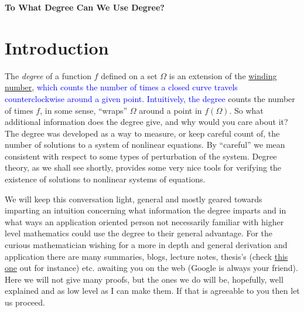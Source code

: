 \documentclass[11pt]{article}
\theoremstyle{plain}
\theoremstyle{definition}
\theoremstyle{remark}
\newcommand{\add}[1]{\textcolor{blue}{#1}}
\begin{document}
\begin{center}
\textbf{To What Degree Can We Use Degree?} %
\end{center}

\section{Introduction}
The \emph{degree} of a function $f$ defined on a set $\Omega$
is an extension of the \href{https://en.wikipedia.org/wiki/Winding_number}{winding number},
\add{which counts the number of times a closed curve travels counterclockwise around a given point.
Intuitively, the degree} counts the number of times $f$, in some sense, ``wraps'' $\Omega$ around a point in $f\left(\Omega\right)$.   
So what additional information does the degree give, and why would you care about it?
The degree was developed as a way to measure, or keep careful count of, the number of solutions to a system of nonlinear equations.
By ``careful'' we mean consistent with respect to some types of perturbation of the system.
Degree theory, as we shall see shortly, provides some very nice tools for verifying the existence of solutions to nonlinear systems of equations. 

\medskip
We will keep this conversation light, general and mostly geared towards imparting an intuition concerning what information the degree imparts and in what ways an application oriented person not necessarily familiar with higher level mathematics could use the degree to their general advantage. For the curious mathematician wishing for a more in depth and general derivation and application there are many summaries, blogs, lecture notes, thesis's (check \href{http://jultika.oulu.fi/files/isbn9789514284878.pdf}{this one} out for instance) etc. awaiting you on the web (Google is always your friend). Here we will not give many proofs, but the ones we do will be, hopefully, well explained and as low level as I can make them. If that is agreeable to you then let us proceed. 
\end{document}
